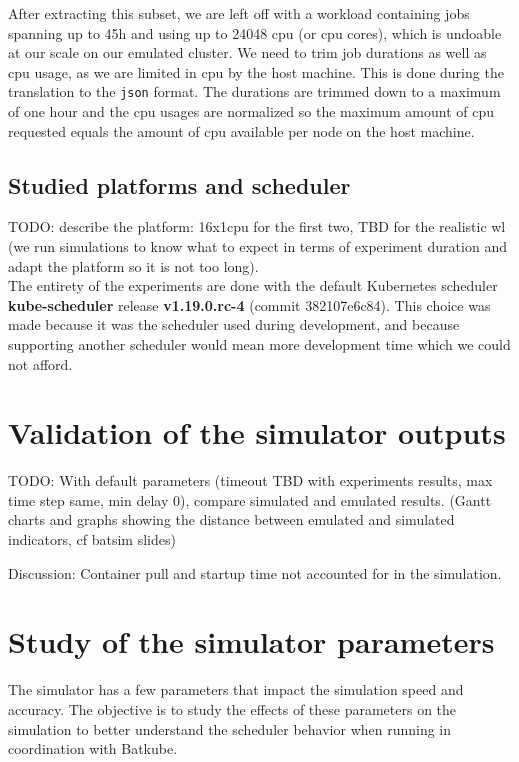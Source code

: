 \documentclass[12pt, a4paper]{memoir}
\begin{document}
After extracting this subset, we are left off with a workload containing jobs
spanning up to 45h and using up to 24048 cpu (or cpu cores), which is undoable
at our scale on our emulated cluster. We need to trim job durations as well as
cpu usage, as we are limited in cpu by the host machine. This is done during
the translation to the \texttt{json} format. The durations are trimmed down to
a maximum of one hour and the cpu usages are normalized so the maximum amount
of cpu requested equals the amount of cpu available per node on the host
machine.

\subsection{Studied platforms and scheduler}

TODO: describe the platform: 16x1cpu for the first two, TBD for the realistic
wl (we run simulations to know what to expect in terms of experiment duration
and adapt the platform so it is not too long).\\

The entirety of the experiments are done with the default Kubernetes scheduler
\textbf{kube-scheduler} release \textbf{v1.19.0.rc-4} (commit 382107e6c84).
This choice was made because it was the scheduler used during development, and
because supporting another scheduler would mean more development time which we
could not afford.

\section{Validation of the simulator outputs}

TODO: With default parameters (timeout TBD with experiments results, max time step same, min delay 0), compare simulated and emulated results. (Gantt
charts and graphs showing the distance between emulated and simulated
indicators, cf batsim slides)

Discussion:
Container pull and startup time not accounted for in the simulation.

\section{Study of the simulator parameters}

The simulator has a few parameters that impact the simulation speed and
accuracy. The objective is to study the effects of these parameters on the
simulation to better understand the scheduler behavior when running in
coordination with Batkube.\\
\end{document}
